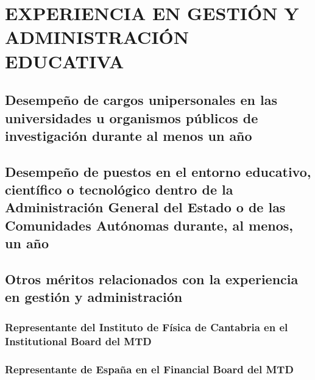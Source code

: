 \documentclass[a4paper, 11pt, twoside, openright]{report}
\begin{document}
\chapter{EXPERIENCIA EN GESTIÓN Y ADMINISTRACIÓN EDUCATIVA}

\section{Desempeño de cargos unipersonales en las universidades u organismos públicos de investigación durante al menos un año}

\section{Desempeño de puestos en el entorno educativo, científico o tecnológico dentro de la Administración General del Estado o de las Comunidades Autónomas durante, al menos, un año}

\section{Otros méritos relacionados con la experiencia en gestión y administración}

\subsection{Representante del Instituto de Física de Cantabria en el Institutional Board del MTD}


\subsection{Representante de España en el Financial Board del MTD}

\end{document}
